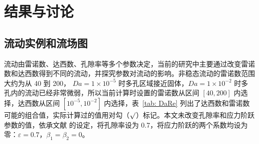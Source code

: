 \chapter{结果与讨论}

\section{流动实例和流场图}\label{sec: flow pattern}

流动由雷诺数、达西数、孔隙率等多个参数决定，当前的研究中主要通过改变雷诺数和达西数得到不同的流动，并探究参数对流动的影响。非稳态流动的雷诺数范围大约为从 40 到 200， $Da=1\times 10^{-5}$ 时多孔区域接近固体，$Da=1\times 10^{-2}$ 时多孔内的流动已经非常微弱，所以当前计算时设置的雷诺数从区间 $[40,200]$ 内选择，达西数从区间 $[10^{-5},10^{-2}]$ 内选择，表~\ref{tab: DaRe} 列出了达西数和雷诺数可能的组合值，实际计算过的值用对勾（$\surd$）标记。本文未改变孔隙率和应力阶跃参数的值，依承文献 \cite{} 的设定，将孔隙率设为 0.7，将应力阶跃的两个系数均设为零：$\varepsilon=0.7$，$\beta_1 = \beta_2=0$。

